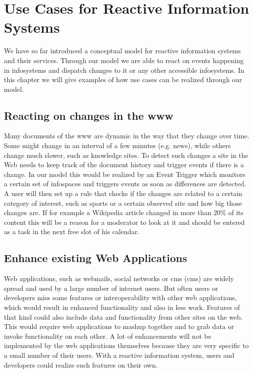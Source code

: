 

\chapter{Use Cases for Reactive Information Systems}
We have so far introduced a conceptual model for reactive information systems and their services.
Through our model we are able to react on events happening in \textrm{\glspl{infosystem}} and dispatch changes to it or any other accessible \textrm{\glspl{infosystem}}.
In this chapter we will give examples of how use cases can be realized through our model.

\section{Reacting on changes in the \gls{www}}
Many documents of the \textrm{\gls{www}} are dynamic in the way that they change over time.
Some might change in an interval of a few minutes (e.g. news), while others change much slower, such as knowledge sites.
To detect such changes a site in the Web needs to keep track of the document history and trigger events if there is a change.
In our model this would be realized by an \textrm{Event Trigger} which monitors a certain set of \textrm{\glspl{infospace}} and triggers events as soon as differences are detected.
A user will then set up a rule that checks if the changes are related to a certain category of interest, such as sports or a certain observed site and how big those changes are.
If for example a Wikipedia article changed in more than 20\% of its content this will be a reason for a moderator to look at it and should be entered as a task in the next free slot of his calendar.


\section{Enhance existing Web Applications}
Web applications, such as webmails, social networks or \textrm{\acrlong{cms} (\acrshort{cms})} are widely spread and used by a large number of internet users.
But often users or developers miss some features or interoperability with other web applications, which would result in enhanced functionality and also in less work.
Features of that kind could also include data and functionality from other sites on the web.
This would require web applications to mashup together and to grab data or invoke functionality on each other.
A lot of enhancements will not be implemented by the web applications themselves because they are very specific to a small number of their users.
With a reactive information system, users and developers could realize such features on their own.


